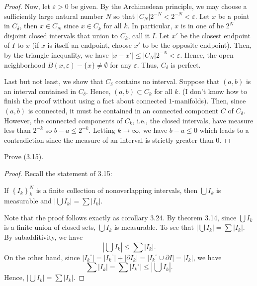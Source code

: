 \begin{proof}
Now, let $\varepsilon>0$ be given. By the Archimedean
principle, we may choose a sufficiently large natural number $N$ so that
$\left|C_N\right|2^{-N}<2^{-N}<\varepsilon$. Let $x$ be a point in
$C_\delta$, then $x\in C_N$ since $x\in C_k$ for all $k$. In particular,
$x$ is in one of he $2^N$ disjoint closed intervals that union to $C_k$,
call it $I$. Let $x'$ be the closest endpoint of $I$ to $x$ (if $x$ is
itself an endpoint, choose $x'$ to be the opposite endpoint). Then, by the
triangle inequality, we have $\left|x-x'\right|\leq
\left|C_N\right|2^{-N}<\varepsilon$. Hence, the open neighborhood
$B(x,\varepsilon)\minus\{x\}\neq\emptyset$ for any $\varepsilon$. Thus,
$C_\delta$ is perfect.

Last but not least, we show that $C_\delta$ contains no interval. Suppose
that $(a,b)$ is an interval contained in $C_\delta$. Hence, $(a,b)\subset
C_k$ for all $k$. (I don't know how to finish the proof without using a
fact about connected $1$-manifolds). Then, since $(a,b)$ is connected, it
must be contained in an connected component $C$ of $C_\delta$. However, the
connected components of $C_k$, i.e., the closed intervals, have measure
less than $2^{-k}$ so $b-a\leq 2^{-k}$. Letting $k\to\infty$, we have
$b-a\leq 0$ which leads to a contradiction since the measure of an interval
is strictly greater than $0$.
\end{proof}
\newpage

\begin{problem}
Prove (3.15).
\end{problem}
\begin{proof}
Recall the statement of 3.15:
\begin{lemma*}
If $\left\{I_k\right\}_k^N$ is a finite collection of nonoverlapping
intervals, then $\bigcup I_k$ is measurable and $\left|\bigcup
  I_k\right|=\sum\left|I_k\right|$.
\end{lemma*}
Note that the proof follows exactly as corollary 3.24. By theorem 3.14,
since $\bigcup I_k$ is a finite union of closed sets, $\bigcup I_k$ is
measurable. To see that $\left|\bigcup I_k\right|=\sum\left|I_k\right|$. By
subadditivity, we have
\[
\left|\bigcup I_k\right|\leq\sum\left|I_k\right|.
\]
On the other hand, since
$\left|{I_k}^\circ\right|=\left|{I_k}^\circ\right|+\left|\partial
  I_k\right|=\left|{I_k}^\circ\cup\partial I\right|=\left|I_k\right|$, we
have
\[
\sum\left|I_k\right|=
\sum\left|{I_k}^\circ\right|\leq
\left|\bigcup I_k\right|.
\]
Hence, $\left|\bigcup I_k\right|=\sum\left|I_k\right|$.
\end{proof}
\newpage

